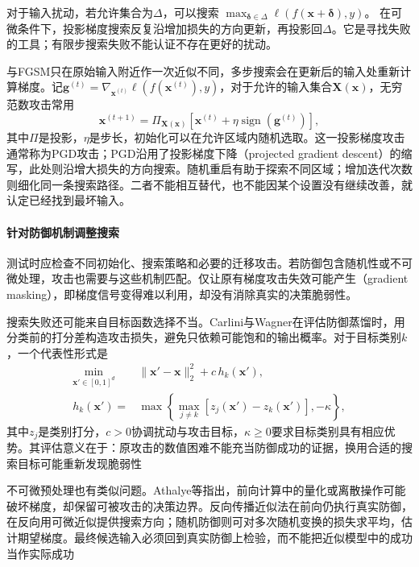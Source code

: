 对于输入扰动，若允许集合为$\Delta$，可以搜索
$\max_{\bm{\delta}\in\Delta}\ell(f(\bm{x}+\bm{\delta}),y)$。
在可微条件下，投影梯度搜索反复沿增加损失的方向更新，再投影回$\Delta$。它是寻找失败的工具；有限步搜索失败不能认证不存在更好的扰动。

与FGSM只在原始输入附近作一次近似不同，多步搜索会在更新后的输入处重新计算梯度。记$\bm{g}^{(t)}=\nabla_{\bm{x}^{(t)}}\ell(f(\bm{x}^{(t)}),y)$，对于允许的输入集合$\bm X(\bm{x})$，无穷范数攻击常用
\begin{equation}
 \bm{x}^{(t+1)}
 =\Pi_{\bm X(\bm{x})}
 \left[
 \bm{x}^{(t)}
 +\eta\operatorname{sign}(\bm{g}^{(t)})
 \right],
 \label{eq:security-pgd}
\end{equation}
其中$\Pi$是投影，$\eta$是步长，初始化可以在允许区域内随机选取。这一投影梯度攻击通常称为PGD攻击；PGD沿用了投影梯度下降（projected gradient descent）的缩写，此处则沿增大损失的方向搜索。随机重启有助于探索不同区域；增加迭代次数则细化同一条搜索路径。二者不能相互替代，也不能因某个设置没有继续改善，就认定已经找到最坏输入。

\paragraph{针对防御机制调整搜索}

测试时应检查不同初始化、搜索策略和必要的迁移攻击。若防御包含随机性或不可微处理，攻击也需要与这些机制匹配。仅让原有梯度攻击失效可能产生（gradient masking），即梯度信号变得难以利用，却没有消除真实的决策脆弱性。

搜索失败还可能来自目标函数选择不当。Carlini与Wagner在评估防御蒸馏时，用分类前的打分差构造攻击损失，避免只依赖可能饱和的输出概率。对于目标类别$k$，一个代表性形式是
\begin{equation}
 \begin{aligned}
 \min_{\bm{x}'\in[0,1]^d}\quad&
 \|\bm{x}'-\bm{x}\|_2^2+c\,h_k(\bm{x}'),\\
 h_k(\bm{x}')={}&
 \max\left\{\max_{j\ne k}
 [z_j(\bm{x}')-z_k(\bm{x}')],-\kappa\right\},
 \end{aligned}
 \label{eq:security-cw}
\end{equation}
其中$z_j$是类别打分，$c>0$协调扰动与攻击目标，$\kappa\geq0$要求目标类别具有相应优势。其评估意义在于：原攻击的数值困难不能充当防御成功的证据，换用合适的搜索目标可能重新发现脆弱性

不可微预处理也有类似问题。Athalye等指出，前向计算中的量化或离散操作可能破坏梯度，却保留可被攻击的决策边界。反向传播近似法在前向仍执行真实防御，在反向用可微近似提供搜索方向；随机防御则可对多次随机变换的损失求平均，估计期望梯度。最终候选输入必须回到真实防御上检验，而不能把近似模型中的成功当作实际成功

